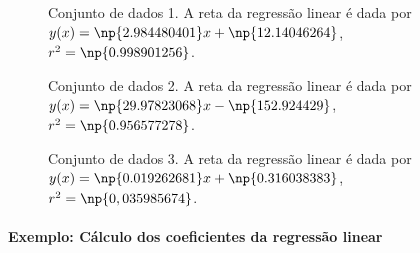 \begin{figure}[!h]
\centering

\caption{Conjunto de dados 1. A reta da regressão linear é dada por $y(x)=\np{2.984480401}x + \np{12.14046264}$, $r^2 = \np{0.998901256}$.}
\label{RetasConjuntosDados1}
\end{figure}

\begin{figure}[!h]\forcerectofloat
\centering

\caption{Conjunto de dados 2. A reta da regressão linear é dada por $y(x)=\np{29.97823068} x - \np{152.924429}$, $r^2=\np{0.956577278}$.}
\label{RetasConjuntosDados2}
\end{figure}

\begin{figure}[!h]\forcerectofloat
\centering

\caption{Conjunto de dados 3. A reta da regressão linear é dada por $y(x)=\np{0.019262681} x + \np{0.316038383}$, $r^2=\np{0,035985674}$.}
\label{RetasConjuntosDados3}
\end{figure}

\paragraph{Exemplo: Cálculo dos coeficientes da regressão linear}

